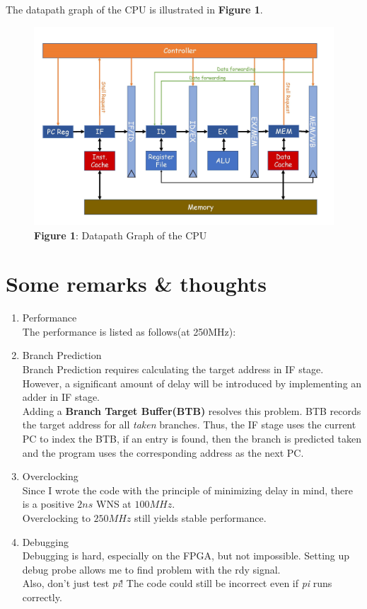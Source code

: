 \documentclass[UTF8, 12pt]{ctexart}
\begin{document}
            The datapath graph of the CPU is illustrated in \textbf{Figure 1}.
            \begin{figure}[h]
                \includegraphics[scale=0.4]{datapath_diagram_2.jpg}
                \centering
                \caption*{\textbf{Figure 1}: Datapath Graph of the CPU}
            \end{figure}
        \section{Some remarks \& thoughts}
        \begin{enumerate}[label=(\arabic*)]
            \item Performance \\
                The performance is listed as follows(at 250MHz):
                 
            \item Branch Prediction \\
                Branch Prediction requires calculating the target address in IF stage. However, a significant amount of delay will be introduced by implementing an adder in IF stage.\\
                Adding a \textbf{Branch Target Buffer(BTB)} resolves this problem. BTB records the target address for all \textit{taken} branches. Thus, the IF stage uses the current PC to index the BTB,
                if an entry is found, then the branch is predicted taken and the program uses the corresponding address as the next PC. 
            \item Overclocking \\
                Since I wrote the code with the principle of minimizing delay in mind, there is a positive $2ns$ WNS at $100MHz$. \\
                Overclocking to $250MHz$ still yields stable performance. \\
            \item Debugging \\
                Debugging is hard, especially on the FPGA, but not impossible. Setting up debug probe allows me to find problem with the rdy signal. \\
                Also, don't just test \textit{pi}! The code could still be incorrect even if \textit{pi} runs correctly. 
        \end{enumerate}
\end{document}
